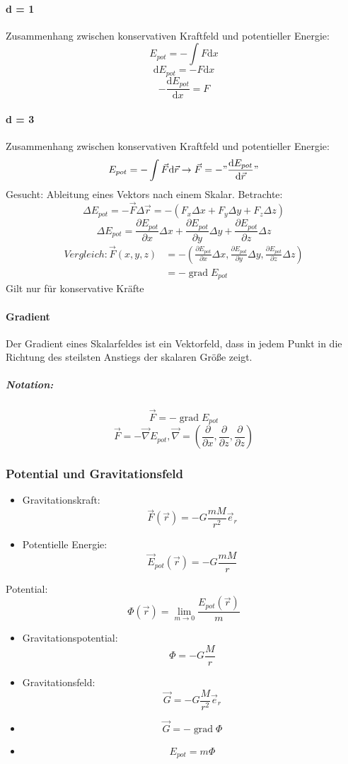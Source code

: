 \documentclass[a4paper]{scrartcl}
\DeclareMathOperator{\grad}{grad}
\renewcommand{\d}{\mathrm{d}}
\renewcommand{\v}[1]{\vec{#1}}
\theoremstyle{definition}
\theoremstyle{plain}
\theoremstyle{plain}
\theoremstyle{remark}
\theoremstyle{remark}
\theoremstyle{remark}
\begin{document}
\paragraph{d = 1}
\label{sec-4-9-4-4}
Zusammenhang zwischen konservativen Kraftfeld und potentieller Energie:
\[E_{pot} = -\int F\d x\]
\[\d E_{pot} = -F\d x\]
\[-\frac{\d E_{pot}}{\d x} = F\]
\paragraph{d = 3}
\label{sec-4-9-4-5}
Zusammenhang zwischen konservativen Kraftfeld und potentieller Energie:
\[E_{pot} = -\int \v F\d\v r \rightarrow \v F = - "\frac{\d E_{pot}}{\d \v r}"\]
Gesucht: Ableitung eines Vektors nach einem Skalar.
Betrachte:\[\Delta E_{pot} = -\v F\Delta \v r = -(F_x \Delta x + F_y \Delta y + F_z \Delta z)\]
\[\Delta E_{pot} = \frac{\partial E_{pot}}{\partial x} \Delta x + \frac{\partial E_{pot}}{\partial y} \Delta y + \frac{\partial E_{pot}}{\partial z} \Delta z\]
\begin{align}
Vergleich:
\v F(x,y,z) &= - (\frac{\partial E_{pot}}{\partial x} \Delta x , \frac{\partial E_{pot}}{\partial y} \Delta y , \frac{\partial E_{pot}}{\partial z} \Delta z) \\
&= -\grad E_{pot}
\end{align}
Gilt nur für konservative Kräfte
\paragraph{Gradient}
\label{sec-4-9-4-6}
Der Gradient eines Skalarfeldes ist ein Vektorfeld, dass in jedem Punkt in die Richtung des steilsten Anstiegs der skalaren Größe zeigt.
\subparagraph{Notation:}
\label{sec-4-9-4-6-1}
\[\v F = -\grad E_{pot}\]
\[\v F = - \v \nabla E_{pot}, \v \nabla = (\frac{\partial}{\partial x}, \frac{\partial}{\partial z}, \frac{\partial}{\partial z})\]
\subsubsection{Potential und Gravitationsfeld}
\label{sec-4-9-5}
\begin{itemize}
\item Gravitationskraft: \[\v F(\v r) = -G\frac{mM}{r^2}\v e_r\]
\item Potentielle Energie: \[\v E_{pot}(\v r) = -G\frac{mM}{r}\]
\end{itemize}
Potential:
\[\Phi(\v r) = \lim_{m \to 0} \frac{E_{pot}(\v r)}{m}\]
\begin{itemize}
\item Gravitationspotential: \[\Phi = -G\frac{M}{r}\]
\item Gravitationsfeld: \[\v G = -G \frac{M}{r^2}\v e_r\]
\item \[\v G = -\grad \Phi\]
\item \[E_{pot} = m\Phi\]
\end{itemize}
\end{document}
